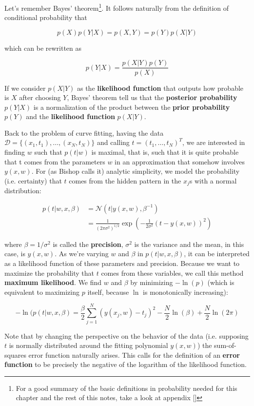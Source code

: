 \documentclass{report}
\begin{document}
Let's remember Bayes' theorem\footnote{For a good summary of the basic definitions in probability needed for this chapter and the rest of this notes, take a look at appendix []}. It follows naturally from the definition of conditional probability that

\[p(X)p(Y|X) = p(X,Y) = p(Y)p(X|Y)\]

which can be rewritten as

\[p(Y|X) = \frac{p(X|Y)p(Y)}{p(X)}\]

If we consider $p(X|Y)$ as the \textbf{likelihood function} that outputs how probable is $X$ after choosing $Y$, Bayes' theorem tell us that the \textbf{posterior probability} $p(Y|X)$ is a normalization of the product between the \textbf{prior probability} $p(Y)$ and the \textbf{likelihood function} $p(X|Y)$.

Back to the problem of curve fitting, having the data $\mathcal{D} = \{(x_1, t_1),\dots,(x_N, t_N)\}$ and calling $t = (t_1,\dots, t_N)^T$, we are interested in finding $w$ such that $p(t|w)$ is maximal, that is, such that it is quite probable that t comes from the parameters $w$ in an approximation that somehow involves $y(x,w)$. For (as Bishop calls it) analytic simplicity, we model the probability (i.e. certainty) that $t$ comes from the hidden pattern in the $x_j$s with a normal distribution:

\begin{align*}
	p(t|w, x, \beta) &= \mathcal{N}(t|y(x,w), \beta^{-1})\\
	&= \frac{1}{(2\pi\sigma^2)^{1/2}}\exp\left(-\frac{1}{2\sigma^2}(t-y(x,w))^2\right)
\end{align*}

where $\beta = 1/\sigma^2$ is called the \textbf{precision}, $\sigma^2$ is the variance and the mean, in this case, is $y(x,w)$. As we're varying $w$ and $\beta$ in $p(t|w,x,\beta)$, it can be interpreted as a likelihood function of these parameters and precision. Because we want to maximize the probability that $t$ comes from these variables, we call this method \textbf{maximum likelihood}. We find $w$ and $\beta$ by minimizing $-\ln(p)$ (which is equivalent to maximizing $p$ itself, because $\ln$ is monotonically increasing):

\[-\ln(p(t|w,x,\beta) = \frac{\beta}{2}\sum_{j=1}^N(y(x_j, w) - t_j)^2 - \frac{N}{2}\ln(\beta) + \frac{N}{2}\ln(2\pi) \]

Note that by changing the perspective on the behavior of the data (i.e. supposing $t$ is normally distributed around the fitting polynomial $y(x,w)$) the sum-of-squares error function naturally arises. This calls for the definition of an \textbf{error function} to be precisely the negative of the logarithm of the likelihood function.
\end{document}
